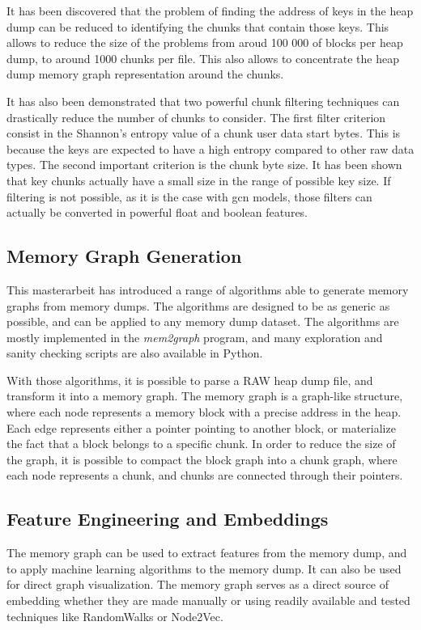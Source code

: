 It has been discovered that the problem of finding the address of keys in the heap dump can be reduced to identifying the chunks that contain those keys. This allows to reduce the size of the problems from aroud 100 000 of blocks per heap dump, to around 1000 chunks per file. This also allows to concentrate the heap dump memory graph representation around the chunks.

It has also been demonstrated that two powerful chunk filtering techniques can drastically reduce the number of chunks to consider. The first filter criterion consist in the Shannon's entropy value of a chunk user data start bytes. This is because the keys are expected to have a high entropy compared to other raw data types. The second important criterion is the chunk byte size. It has been shown that key chunks actually have a small size in the range of possible key size. If filtering is not possible, as it is the case with \acrshort{gcn} models, those filters can actually be converted in powerful float and boolean features.

\subsection{Memory Graph Generation}
This masterarbeit has introduced a range of algorithms able to generate memory graphs from memory dumps. The algorithms are designed to be as generic as possible, and can be applied to any memory dump dataset. The algorithms are mostly implemented in the \textit{mem2graph} program, and many exploration and sanity checking scripts are also available in Python.

With those algorithms, it is possible to parse a RAW heap dump file, and transform it into a memory graph. The memory graph is a graph-like structure, where each node represents a memory block with a precise address in the heap. Each edge represents either a pointer pointing to another block, or materialize the fact that a block belongs to a specific chunk. In order to reduce the size of the graph, it is possible to compact the block graph into a chunk graph, where each node represents a chunk, and chunks are connected through their pointers.

\subsection{Feature Engineering and Embeddings}
The memory graph can be used to extract features from the memory dump, and to apply machine learning algorithms to the memory dump. It can also be used for direct graph visualization. The memory graph serves as a direct source of embedding whether they are made manually or using readily available and tested techniques like RandomWalks or Node2Vec.

